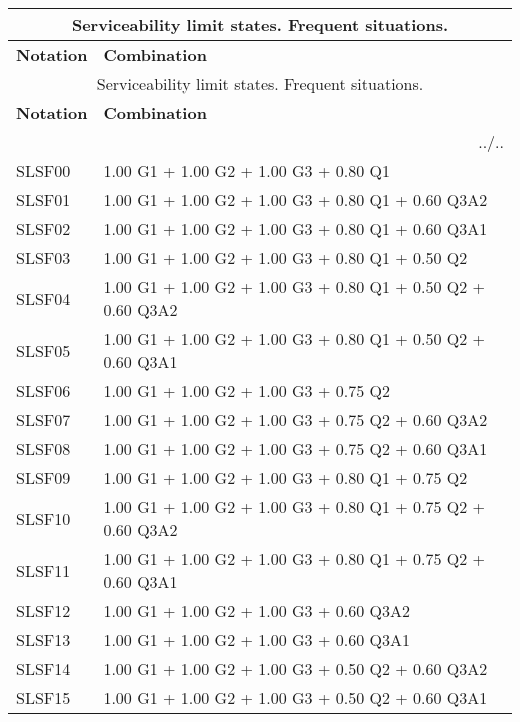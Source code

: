 \begin{center}
\begin{small}
\begin{longtable}{|l|p{10cm}|}
\hline
\multicolumn{2}{|c|}{Serviceability limit states. Frequent situations.}\\
\hline
\textbf{Notation} & \textbf{Combination} \\
\hline
\endfirsthead
\hline
\multicolumn{2}{|c|}{Serviceability limit states. Frequent situations.}\\
\hline
\textbf{Notation} & \textbf{Combination} \\
\hline
\endhead
\hline \multicolumn{2}{|r|}{{../..}} \\ \hline
\endfoot
\hline
\endlastfoot
SLSF00 & 1.00 G1 + 1.00 G2 + 1.00 G3 + 0.80 Q1\\
SLSF01 & 1.00 G1 + 1.00 G2 + 1.00 G3 + 0.80 Q1 + 0.60 Q3A2\\
SLSF02 & 1.00 G1 + 1.00 G2 + 1.00 G3 + 0.80 Q1 + 0.60 Q3A1\\
SLSF03 & 1.00 G1 + 1.00 G2 + 1.00 G3 + 0.80 Q1 + 0.50 Q2\\
SLSF04 & 1.00 G1 + 1.00 G2 + 1.00 G3 + 0.80 Q1 + 0.50 Q2 + 0.60 Q3A2\\
SLSF05 & 1.00 G1 + 1.00 G2 + 1.00 G3 + 0.80 Q1 + 0.50 Q2 + 0.60 Q3A1\\
SLSF06 & 1.00 G1 + 1.00 G2 + 1.00 G3 + 0.75 Q2\\
SLSF07 & 1.00 G1 + 1.00 G2 + 1.00 G3 + 0.75 Q2 + 0.60 Q3A2\\
SLSF08 & 1.00 G1 + 1.00 G2 + 1.00 G3 + 0.75 Q2 + 0.60 Q3A1\\
SLSF09 & 1.00 G1 + 1.00 G2 + 1.00 G3 + 0.80 Q1 + 0.75 Q2\\
SLSF10 & 1.00 G1 + 1.00 G2 + 1.00 G3 + 0.80 Q1 + 0.75 Q2 + 0.60 Q3A2\\
SLSF11 & 1.00 G1 + 1.00 G2 + 1.00 G3 + 0.80 Q1 + 0.75 Q2 + 0.60 Q3A1\\
SLSF12 & 1.00 G1 + 1.00 G2 + 1.00 G3 + 0.60 Q3A2\\
SLSF13 & 1.00 G1 + 1.00 G2 + 1.00 G3 + 0.60 Q3A1\\
SLSF14 & 1.00 G1 + 1.00 G2 + 1.00 G3 + 0.50 Q2 + 0.60 Q3A2\\
SLSF15 & 1.00 G1 + 1.00 G2 + 1.00 G3 + 0.50 Q2 + 0.60 Q3A1\\
\hline
\end{longtable}
\end{small}
\end{center}
